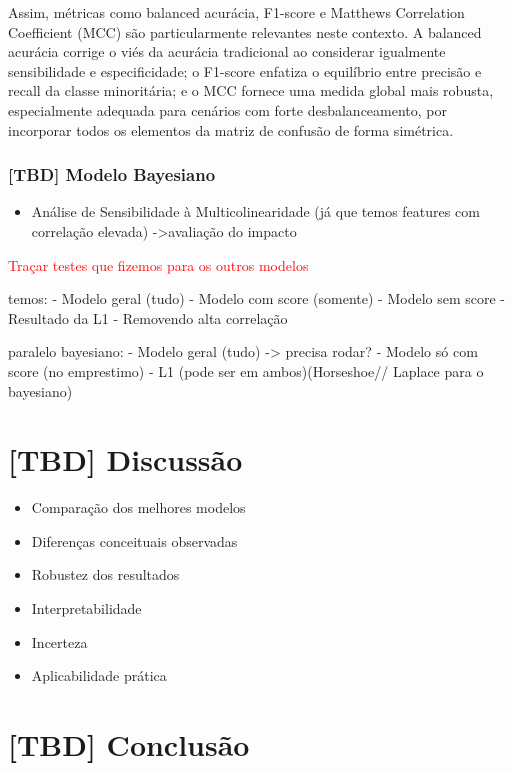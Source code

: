 \documentclass[
  brazilian,
  12pt,
  letterpaper,
  DIV=11,
  numbers=noendperiod]{scrartcl}
\providecommand{\tightlist}{%
  \setlength{\itemsep}{0pt}\setlength{\parskip}{0pt}}
\newcommand{\red}[1]{\textcolor{red}{#1}}
\begin{document}
Assim, métricas como balanced acurácia, F1-score e Matthews Correlation
Coefficient (MCC) são particularmente relevantes neste contexto. A
balanced acurácia corrige o viés da acurácia tradicional ao considerar
igualmente sensibilidade e especificidade; o F1-score enfatiza o
equilíbrio entre precisão e recall da classe minoritária; e o MCC
fornece uma medida global mais robusta, especialmente adequada para
cenários com forte desbalanceamento, por incorporar todos os elementos
da matriz de confusão de forma simétrica.

\subsubsection{{[}TBD{]} Modelo Bayesiano}\label{tbd-modelo-bayesiano}

\begin{itemize}
\tightlist
\item
  Análise de Sensibilidade à Multicolinearidade (já que temos features
  com correlação elevada) -\textgreater avaliação do impacto
\end{itemize}

\red{Traçar testes que fizemos para os outros modelos}

temos: - Modelo geral (tudo) - Modelo com score (somente) - Modelo sem
score - Resultado da L1 - Removendo alta correlação

paralelo bayesiano: - Modelo geral (tudo) -\textgreater{} precisa rodar?
- Modelo só com score (no emprestimo) - L1 (pode ser em
ambos)(Horseshoe// Laplace para o bayesiano)

\section{{[}TBD{]} Discussão}\label{tbd-discussuxe3o}

\begin{itemize}
\tightlist
\item
  Comparação dos melhores modelos
\item
  Diferenças conceituais observadas
\item
  Robustez dos resultados
\item
  Interpretabilidade
\item
  Incerteza
\item
  Aplicabilidade prática
\end{itemize}

\section{{[}TBD{]} Conclusão}\label{tbd-conclusuxe3o}
\end{document}
